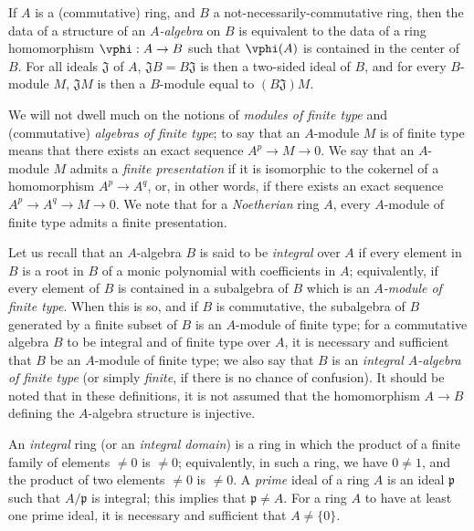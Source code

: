 \begin{env}[1.0.4]
\label{0.1.0.4}
If $A$ is a (commutative) ring, and $B$ a not-necessarily-commutative ring, then the data of a structure of an \emph{$A$-algebra} on $B$ is equivalent to the data of a ring homomorphism $\vphi:A\to B$ such that $\vphi(A)$ is contained in the center of $B$.
For all ideals $\mathfrak{J}$ of $A$, $\mathfrak{J}B=B\mathfrak{J}$ is then a two-sided ideal of $B$, and for every $B$-module $M$, $\mathfrak{J}M$ is then a $B$-module equal to $(B\mathfrak{J})M$.
\end{env}

\begin{env}[1.0.5]
\label{0.1.0.5}
We will not dwell much on the notions of \emph{modules of finite type} and
(commutative) \emph{algebras of finite type};
to say that an $A$-module $M$ is of finite type means that there exists
an exact sequence $A^p\to M\to 0$.
We say that an $A$-module $M$ admits a \emph{finite presentation} if it is isomorphic to the cokernel of a homomorphism $A^p\to A^q$, or, in other words, if there exists an exact sequence $A^p\to A^q\to M\to 0$.
We note that for a \emph{Noetherian} ring $A$, every $A$-module of finite type admits a finite presentation.

Let us recall that an $A$-algebra $B$ is said to be \emph{integral} over $A$ if every element in $B$ is a root in $B$ of a monic polynomial with coefficients in $A$;
equivalently, if every element of $B$ is contained in a subalgebra of $B$ which is an \emph{$A$-module of finite type}.
When this is so, and if $B$ is commutative, the subalgebra of $B$ generated by a finite subset of $B$ is an $A$-module of finite type;
for a commutative algebra $B$ to be integral and of finite type over $A$, it is necessary and sufficient that $B$ be an $A$-module of finite type;
we also say that $B$ is an \emph{integral $A$-algebra of finite type} (or simply \emph{finite}, if there is no chance of confusion).
It should be noted that in these definitions, it is not assumed that the homomorphism $A\to B$ defining the $A$-algebra structure is injective.
\end{env}

\begin{env}[1.0.6]
\label{0.1.0.6}
An \emph{integral} ring (or an \emph{integral domain}) is a ring in which the product of a finite family of elements $\neq 0$ is $\neq 0$;
equivalently, in such a ring, we have $0\neq 1$, and the product of two elements $\neq 0$ is $\neq0$.
A \emph{prime} ideal of a ring $A$ is an ideal $\mathfrak{p}$ such that $A/\mathfrak{p}$ is integral;
this implies that $\mathfrak{p}\neq A$.
For a ring $A$ to have at least one prime ideal, it is necessary and sufficient that $A\neq\{0\}$.
\end{env}

